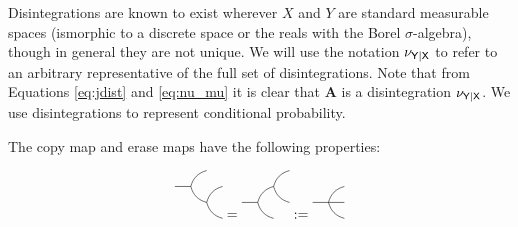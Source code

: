 Disintegrations are known to exist wherever $X$ and $Y$ are standard measurable spaces (ismorphic to a discrete space or the reals with the Borel $\sigma$-algebra), though in general they are not unique. We will use the notation $\nu_{\mathsf{Y}|\mathsf{X}}$ to refer to an arbitrary representative of the full set of disintegrations. Note that from Equations \ref{eq:jdist} and \ref{eq:nu_mu} it is clear that $\mathbf{A}$ is a disintegration $\nu_{\mathsf{Y}|\mathsf{X}}$. We use disintegrations to represent conditional probability.

The copy map and erase maps have the following properties:

\begin{align}
	\begin{tikzpicture}[scale=0.8]
	\path (0,0) coordinate (A) 
	++ (0.5,0) coordinate (B)
	+ (0.5,0.5) coordinate (C)
	++ (0.5,-0.5) coordinate (D)
	+(0.5,0.5) coordinate (E)
	+(0.5,-0.5) coordinate (F);
	\draw (A) -- (B);
	\draw (B) to [bend left] (C);
	\draw (B) to [bend right] (D);
	\draw (D) to [bend left] (E);
	\draw (D) to [bend right] (F);
	\end{tikzpicture}
	=
	\begin{tikzpicture}[scale=0.8]
	\path (0,0) coordinate (A) 
	++ (0.5,0) coordinate (B)
	+ (0.5,-0.5) coordinate (C)
	++ (0.5,0.5) coordinate (D)
	+(0.5,0.5) coordinate (E)
	+(0.5,-0.5) coordinate (F);
	\draw (A) -- (B);
	\draw (B) to [bend right] (C);
	\draw (B) to [bend left] (D);
	\draw (D) to [bend left] (E);
	\draw (D) to [bend right] (F);
	\end{tikzpicture}
	:=
		\begin{tikzpicture}[scale=0.8]
	\path (0,0) coordinate (A) 
	++ (0.5,0) coordinate (B)
	+ (0.5,-0.5) coordinate (C)
	+ (0.5,0) coordinate (D)
	+(0.5,0.5) coordinate (E);
	\draw (A) -- (B);
	\draw (B) to [bend right] (C);
	\draw (B) -- (D);
	\draw (B) to [bend left] (E);
	\end{tikzpicture}\label{eq:ccom1}
\end{align}

